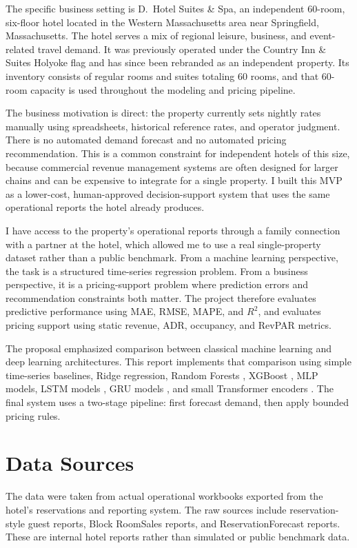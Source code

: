 \documentclass[conference]{IEEEtran}
\begin{document}
The specific business setting is D.\ Hotel Suites \& Spa, an independent 60-room, six-floor hotel located in the Western Massachusetts area near Springfield, Massachusetts. The hotel serves a mix of regional leisure, business, and event-related travel demand. It was previously operated under the Country Inn \& Suites Holyoke flag and has since been rebranded as an independent property. Its inventory consists of regular rooms and suites totaling 60 rooms, and that 60-room capacity is used throughout the modeling and pricing pipeline.

The business motivation is direct: the property currently sets nightly rates manually using spreadsheets, historical reference rates, and operator judgment. There is no automated demand forecast and no automated pricing recommendation. This is a common constraint for independent hotels of this size, because commercial revenue management systems are often designed for larger chains and can be expensive to integrate for a single property. I built this MVP as a lower-cost, human-approved decision-support system that uses the same operational reports the hotel already produces.

I have access to the property's operational reports through a family connection with a partner at the hotel, which allowed me to use a real single-property dataset rather than a public benchmark. From a machine learning perspective, the task is a structured time-series regression problem. From a business perspective, it is a pricing-support problem where prediction errors and recommendation constraints both matter. The project therefore evaluates predictive performance using MAE, RMSE, MAPE, and $R^2$, and evaluates pricing support using static revenue, ADR, occupancy, and RevPAR metrics.

The proposal emphasized comparison between classical machine learning and deep learning architectures. This report implements that comparison using simple time-series baselines, Ridge regression, Random Forests \cite{breiman2001random}, XGBoost \cite{chen2016xgboost}, MLP models, LSTM models \cite{hochreiter1997lstm}, GRU models \cite{cho2014gru}, and small Transformer encoders \cite{vaswani2017attention}. The final system uses a two-stage pipeline: first forecast demand, then apply bounded pricing rules.

\section{Data Sources}
The data were taken from actual operational workbooks exported from the hotel's reservations and reporting system. The raw sources include reservation-style guest reports, Block RoomSales reports, and ReservationForecast reports. These are internal hotel reports rather than simulated or public benchmark data.
\end{document}
